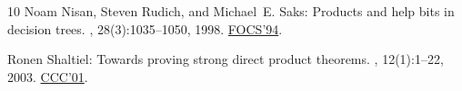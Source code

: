 \documentclass[11pt]{article}
\numberwithin{equation}{section}
\theoremstyle{definition}
\theoremstyle{plain}
\begin{document}
\begin{thebibliography}{10}
{\sc Noam Nisan, Steven Rudich, and Michael~E. Saks}: Products and help bits in
  decision trees.
, 28(3):1035--1050, 1998.
\newblock \prelim \href{https://doi.org/10.1109/SFCS.1994.365683}{FOCS'94}.
\newblock [\epfmtdoi{10.1137/S0097539795282444}]

{\sc Ronen Shaltiel}: Towards proving strong direct product theorems.
, 12(1):1--22, 2003.
\newblock \prelim \href{https://doi.org/10.1109/CCC.2001.933878}{CCC'01}.

\end{thebibliography}
\end{document}
